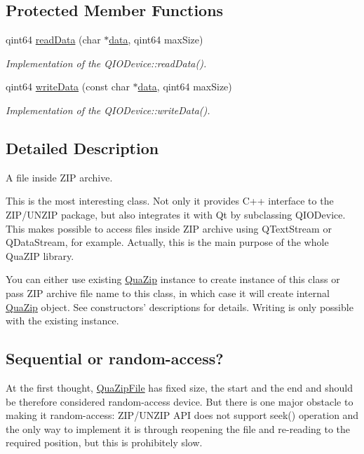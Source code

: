 \subsection*{Protected Member Functions}
\begin{DoxyCompactItemize}
\item 
qint64 \hyperlink{class_qua_zip_file_aa1f2274e1579327855a17d67a9046ec2}{read\-Data} (char $\ast$\hyperlink{glext_8h_a8850df0785e6fbcc2351af3b686b8c7a}{data}, qint64 max\-Size)
\begin{DoxyCompactList}\small\item\em Implementation of the Q\-I\-O\-Device\-::read\-Data(). \end{DoxyCompactList}\item 
qint64 \hyperlink{class_qua_zip_file_abd07949a6fcc2ef094d2be5398bc8e7c}{write\-Data} (const char $\ast$\hyperlink{glext_8h_a8850df0785e6fbcc2351af3b686b8c7a}{data}, qint64 max\-Size)
\begin{DoxyCompactList}\small\item\em Implementation of the Q\-I\-O\-Device\-::write\-Data(). \end{DoxyCompactList}\end{DoxyCompactItemize}


\subsection{Detailed Description}
A file inside Z\-I\-P archive. 

This is the most interesting class. Not only it provides C++ interface to the Z\-I\-P/\-U\-N\-Z\-I\-P package, but also integrates it with Qt by subclassing Q\-I\-O\-Device. This makes possible to access files inside Z\-I\-P archive using Q\-Text\-Stream or Q\-Data\-Stream, for example. Actually, this is the main purpose of the whole Qua\-Z\-I\-P library.

You can either use existing \hyperlink{class_qua_zip}{Qua\-Zip} instance to create instance of this class or pass Z\-I\-P archive file name to this class, in which case it will create internal \hyperlink{class_qua_zip}{Qua\-Zip} object. See constructors' descriptions for details. Writing is only possible with the existing instance.\hypertarget{class_qua_zip_file_quazipfile-sequential}{}\subsection{Sequential or random-\/access?}\label{class_qua_zip_file_quazipfile-sequential}
At the first thought, \hyperlink{class_qua_zip_file}{Qua\-Zip\-File} has fixed size, the start and the end and should be therefore considered random-\/access device. But there is one major obstacle to making it random-\/access\-: Z\-I\-P/\-U\-N\-Z\-I\-P A\-P\-I does not support seek() operation and the only way to implement it is through reopening the file and re-\/reading to the required position, but this is prohibitely slow.

